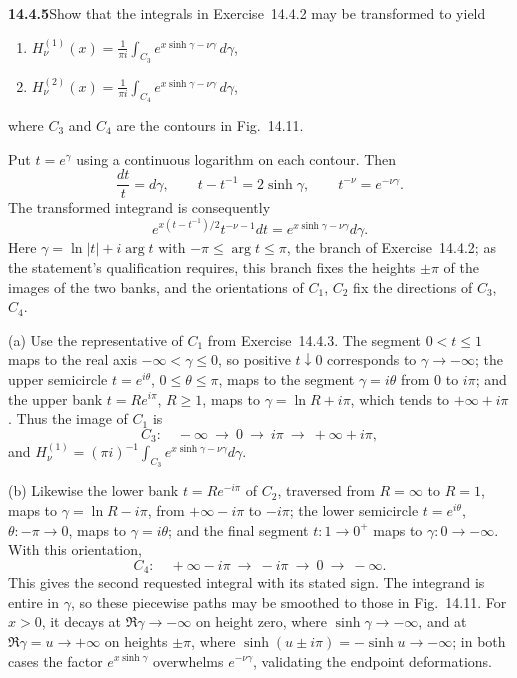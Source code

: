 \par\bigskip
\noindent\textbf{14.4.5}\quad Show that the integrals in
Exercise~14.4.2 may be transformed to yield
\begin{enumerate}
\item[(a)] $H_{\nu}^{(1)}(x)=\displaystyle\frac{1}{\pi i}
\int_{C_{3}}e^{x\sinh\gamma-\nu\gamma}\,d\gamma$,
\item[(b)] $H_{\nu}^{(2)}(x)=\displaystyle\frac{1}{\pi i}
\int_{C_{4}}e^{x\sinh\gamma-\nu\gamma}\,d\gamma$,
\end{enumerate}
where $C_{3}$ and $C_{4}$ are the contours in Fig.~14.11.
\par{}
\solution
Put $t=e^\gamma$ using a continuous logarithm on each contour.
Then
\[
\frac{dt}{t}=d\gamma,\qquad
t-t^{-1}=2\sinh\gamma,\qquad t^{-\nu}=e^{-\nu\gamma}.
\]
The transformed integrand is consequently
\[
e^{x(t-t^{-1})/2}t^{-\nu-1}dt
=e^{x\sinh\gamma-\nu\gamma}d\gamma.
\]
Here $\gamma=\ln|t|+i\arg t$ with $-\pi\le\arg t\le\pi$, the
branch of Exercise~14.4.2; as the statement's qualification
requires, this branch fixes the heights $\pm\pi$ of the images of
the two banks, and the orientations of $C_1$, $C_2$ fix the
directions of $C_3$, $C_4$.

(a) Use the representative of $C_1$ from Exercise~14.4.3. The
segment $0<t\le1$ maps to the real axis $-\infty<\gamma\le0$, so
positive $t\downarrow0$ corresponds to $\gamma\to-\infty$; the upper
semicircle $t=e^{i\theta}$, $0\le\theta\le\pi$, maps to the segment
$\gamma=i\theta$ from $0$ to $i\pi$; and the upper bank
$t=Re^{i\pi}$, $R\ge1$, maps to $\gamma=\ln R+i\pi$, which tends to
$+\infty+i\pi$. Thus the image of $C_1$ is
\[
C_3:\quad -\infty\ \longrightarrow\ 0\
\longrightarrow\ i\pi\ \longrightarrow\ +\infty+i\pi,
\]
and $H_\nu^{(1)}=(\pi i)^{-1}\int_{C_3}
e^{x\sinh\gamma-\nu\gamma}d\gamma$.

(b) Likewise the lower bank $t=Re^{-i\pi}$ of $C_2$, traversed
from $R=\infty$ to $R=1$, maps to $\gamma=\ln R-i\pi$, from
$+\infty-i\pi$ to $-i\pi$; the lower semicircle
$t=e^{i\theta}$, $\theta:-\pi\to0$, maps to $\gamma=i\theta$; and
the final segment $t:1\to0^+$ maps to $\gamma:0\to-\infty$. With
this orientation,
\[
C_4:\quad +\infty-i\pi\ \longrightarrow\ -i\pi\
\longrightarrow\ 0\ \longrightarrow\ -\infty.
\]
This gives the second requested integral with its stated sign.
The integrand is entire in $\gamma$, so these piecewise paths may
be smoothed to those in Fig.~14.11. For $x>0$, it decays at
$\Re\gamma\to-\infty$ on height zero, where
$\sinh\gamma\to-\infty$, and at $\Re\gamma=u\to+\infty$ on heights
$\pm\pi$, where $\sinh(u\pm i\pi)=-\sinh u\to-\infty$; in both
cases the factor $e^{x\sinh\gamma}$ overwhelms $e^{-\nu\gamma}$,
validating the endpoint deformations.

